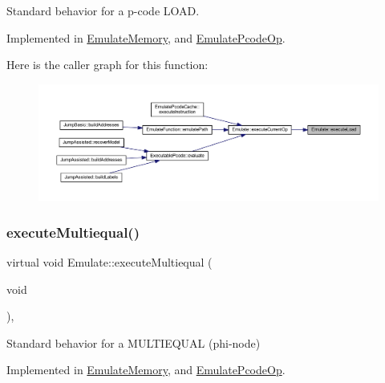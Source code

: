 Standard behavior for a p-\/code L\+O\+AD. 



Implemented in \mbox{\hyperlink{class_emulate_memory_ad612d22e967669919fd5c8538ade212f}{Emulate\+Memory}}, and \mbox{\hyperlink{class_emulate_pcode_op_ab665b04ab8db4b7025e1a5b6a05189ea}{Emulate\+Pcode\+Op}}.

Here is the caller graph for this function\+:
\nopagebreak
\begin{figure}[H]
\begin{center}
\leavevmode
\includegraphics[width=350pt]{class_emulate_acc9c4d2ddbfe4ff639e320d30a212e56_icgraph}
\end{center}
\end{figure}
\mbox{\label{class_emulate_ab98cf68b6d37869f65825f3fdf03019c}} 
\subsubsection{\texorpdfstring{executeMultiequal()}{executeMultiequal()}}
{\footnotesize\ttfamily virtual void Emulate\+::execute\+Multiequal (\begin{DoxyParamCaption}\item[{void}]{ }\end{DoxyParamCaption})\hspace{0.3cm}{\ttfamily [protected]}, {}}



Standard behavior for a M\+U\+L\+T\+I\+E\+Q\+U\+AL (phi-\/node) 



Implemented in \mbox{\hyperlink{class_emulate_memory_ae7dc193d1cdcc12ad376a1cd1505fe59}{Emulate\+Memory}}, and \mbox{\hyperlink{class_emulate_pcode_op_a0d8951da9a7c253ad8bf4892fff9760a}{Emulate\+Pcode\+Op}}.

